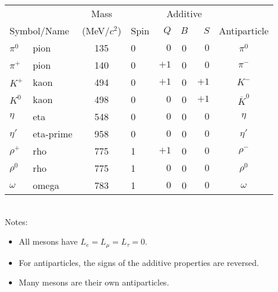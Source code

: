 \documentclass[11pt]{article}
\begin{document}
\begin{table}[tbph]
\begin{tabular}[tbp]{llclrcrc}
&& Mass && \multicolumn{3}{|c|}{Additive}& \\
\multicolumn{2}{l}{Symbol/Name} & (MeV/$c^2$) & Spin\hspace{4mm} & \multicolumn{1}{|r}{$Q$}
 & $B$ & \multicolumn{1}{r|}{$S$} & Antiparticle \\
\hline\hline
$\pi^0$  & pion      & 135   & 0 & $ 0$ & 0 & $0$  & $\pi^0$ \\[0.5ex]
$\pi^+$  & pion      & 140   & 0 & $+1$ & 0 & $0$  & $\pi^-$ \\
$K^+$    & kaon      & 494   & 0 & $+1$ & 0 & $+1$ & $K^-$   \\
$K^0$    & kaon      & 498   & 0 & $ 0$ & 0 & $+1$ & $\overline K^0$\\[0.5ex]
$\eta$   & eta       & 548   & 0 & $ 0$ & 0 & $ 0$ & $\eta$  \\
$\eta'$  & eta-prime & 958   & 0 & $ 0$ & 0 & $ 0$ & $\eta'$ \\[0.5ex]
$\rho^+$ & rho       & 775   & 1 & $+1$ & 0 & $ 0$ & $\rho^-$\\
$\rho^0$ & rho       & 775   & 1 & $ 0$ & 0 & $ 0$ & $\rho^0$\\
$\omega$ & omega     & 783   & 1 & $ 0$ & 0 & $ 0$ & $\omega$\\
\hline
\end{tabular}\\[0.5ex]
Notes:
\vspace{-4mm}
\begin{itemize}
\setlength{\itemsep}{-2mm}
\item All mesons have $L_e=L_\mu=L_\tau = 0$.
\item For antiparticles, the signs of the additive properties are reversed.
\item Many mesons are their own antiparticles.
\end{itemize}
\end{table}
\end{document}
